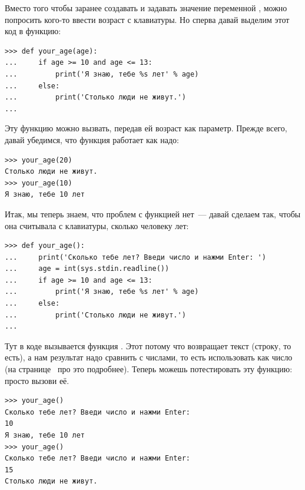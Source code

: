 Вместо того чтобы заранее создавать и задавать значение переменной , можно попросить кого-то ввести возраст с клавиатуры. Но сперва давай выделим этот код в функцию:

\begin{listing}
\begin{verbatim}
>>> def your_age(age):
...     if age >= 10 and age <= 13:
...         print('Я знаю, тебе %s лет' % age)
...     else:
...         print('Столько люди не живут.')
... 
\end{verbatim}
\end{listing}

Эту функцию можно вызвать, передав ей возраст как параметр. Прежде всего, давай убедимся, что функция работает как надо:

\begin{listing}
\begin{verbatim}
>>> your_age(20)
Столько люди не живут.
>>> your_age(10)
Я знаю, тебе 10 лет
\end{verbatim}
\end{listing}

Итак, мы теперь знаем, что проблем с функцией нет — давай сделаем так, чтобы она считывала с клавиатуры, сколько человеку лет:

\begin{listing}
\begin{verbatim}
>>> def your_age():
...     print('Сколько тебе лет? Введи число и нажми Enter: ')
...     age = int(sys.stdin.readline())
...     if age >= 10 and age <= 13:
...         print('Я знаю, тебе %s лет' % age)
...     else:
...         print('Столько люди не живут.')
... 
\end{verbatim}
\end{listing}

Тут в коде вызывается функция . Этот потому что  возвращает текст (строку, то есть), а нам результат надо сравнить с числами, то есть использовать как число (на странице \pageref{whatsthedifference} про это подробнее). Теперь можешь потестировать эту функцию: просто вызови её.

\begin{listing}
\begin{verbatim}
>>> your_age()
Сколько тебе лет? Введи число и нажми Enter:
10
Я знаю, тебе 10 лет
>>> your_age()
Сколько тебе лет? Введи число и нажми Enter:
15
Столько люди не живут.
\end{verbatim}
\end{listing}

